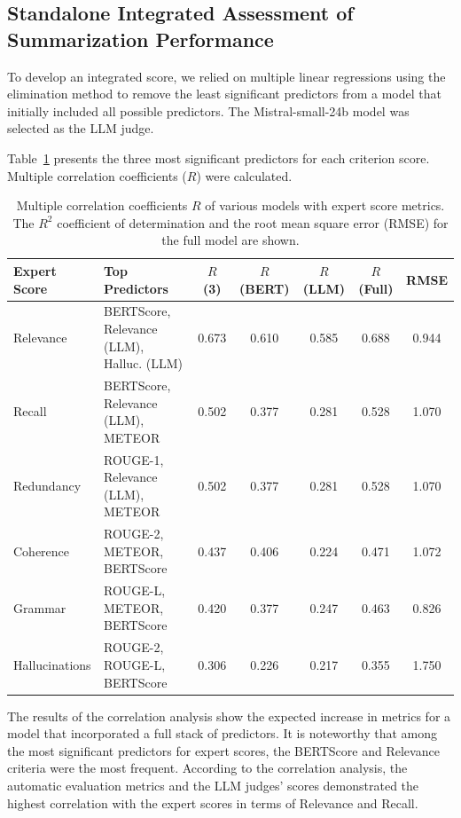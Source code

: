 \documentclass[runningheads]{llncs}
\begin{document}
\subsection{Standalone Integrated Assessment of Summarization Performance}\label{subsec:integrated}

To develop an integrated score, we relied on multiple linear regressions using the elimination method to remove the least significant predictors from a model that initially included all possible predictors. The Mistral-small-24b model was selected as the LLM judge.

Table~\ref{tab:regression} presents the three most significant predictors for each criterion score. Multiple correlation coefficients ($R$) were calculated.

\begin{table}[t]
\caption{Multiple correlation coefficients $R$ of various models with expert score metrics. The $R^2$ coefficient of determination and the root mean square error (RMSE) for the full model are shown.}\label{tab:regression}
\centering
\small
\begin{tabular}{@{}lp{3.5cm}ccccc@{}}
\toprule
\textbf{Expert Score} & \textbf{Top Predictors} & \textbf{$R$ (3)} & \textbf{$R$ (BERT)} & \textbf{$R$ (LLM)} & \textbf{$R$ (Full)} & \textbf{RMSE} \\
\midrule
Relevance & BERTScore, Relevance (LLM), Halluc. (LLM) & 0.673 & 0.610 & 0.585 & 0.688 & 0.944 \\
Recall & BERTScore, Relevance (LLM), METEOR & 0.502 & 0.377 & 0.281 & 0.528 & 1.070 \\
Redundancy & ROUGE-1, Relevance (LLM), METEOR & 0.502 & 0.377 & 0.281 & 0.528 & 1.070 \\
Coherence & ROUGE-2, METEOR, BERTScore & 0.437 & 0.406 & 0.224 & 0.471 & 1.072 \\
Grammar & ROUGE-L, METEOR, BERTScore & 0.420 & 0.377 & 0.247 & 0.463 & 0.826 \\
Hallucinations & ROUGE-2, ROUGE-L, BERTScore & 0.306 & 0.226 & 0.217 & 0.355 & 1.750 \\
\bottomrule
\end{tabular}
\end{table}

The results of the correlation analysis show the expected increase in metrics for a model that incorporated a full stack of predictors. It is noteworthy that among the most significant predictors for expert scores, the BERTScore and Relevance criteria were the most frequent. According to the correlation analysis, the automatic evaluation metrics and the LLM judges' scores demonstrated the highest correlation with the expert scores in terms of Relevance and Recall.
\end{document}
